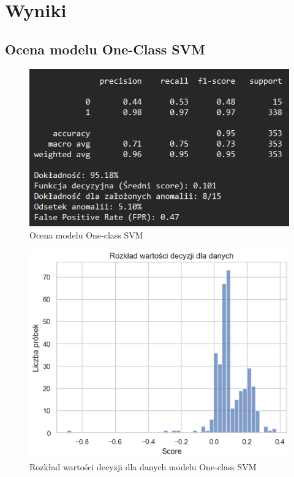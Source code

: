 \documentclass[a4paper,fleqn]{cas-dc}
\begin{document}
\section{Wyniki}

\subsection{Ocena modelu One-Class SVM}

\begin{figure}[h]
	\includegraphics[scale=.70]{wykresy/ocena1.png}
	\caption{Ocena modelu One-class SVM}
	\label{FIG:1}
\end{figure}

\begin{figure}[h]
	\includegraphics[scale=.57]{wykresy/ocena2.png}
	\caption{Rozkład wartości decyzji dla danych modelu One-class SVM}
	\label{FIG:1}
\end{figure}
\end{document}
